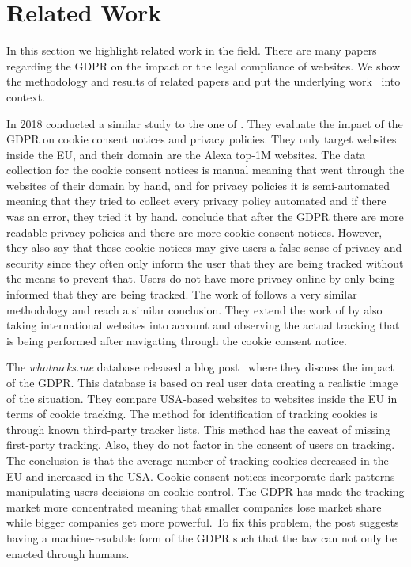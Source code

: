 \section{Related Work}
\label{sec:related}

In this section we highlight related work in the field. There are many papers regarding the GDPR on the impact or
the legal compliance of websites. We show the methodology and results of related papers and put the underlying
work~\cite{sanchez2019can} into context.

In 2018  conducted a similar study to the one of . They evaluate the impact of the
GDPR on cookie consent notices and privacy policies. They only target websites inside the EU, and their domain are the
Alexa top-1M websites. The data collection for the cookie consent notices is manual meaning that
\citeauthor{degeling2018we} went through the websites of their domain by hand, and for privacy policies it is
semi-automated meaning that they tried to collect every privacy policy automated and if there was an error, they tried
it by hand. \citeauthor{degeling2018we} conclude that after the GDPR there are more readable privacy policies
and there are more cookie consent notices. However, they also say that these cookie notices may give users a false sense
of privacy and security since they often only inform the user that they are being tracked without the means to prevent
that. Users do not have more privacy online by only being informed that they are being tracked. The work of
 follows a very similar methodology and reach a similar conclusion. They extend the work of
 by also taking international websites into account and observing the actual tracking that is being
performed after navigating through the cookie consent notice.

The \emph{whotracks.me} database released a blog post~\cite{whathappened} where they discuss the impact of the GDPR.
This database is based on real user data creating a realistic image of the situation. They compare USA-based websites to
websites inside the EU in terms of cookie tracking. The method for identification of tracking cookies is through known third-party
tracker lists. This method has the caveat of missing first-party tracking. Also, they do not factor in the consent of
users on tracking. The conclusion is that the average number of tracking cookies decreased in the EU and increased in
the USA. Cookie consent notices incorporate dark patterns manipulating users decisions on cookie control. The GDPR has
made the tracking market more concentrated meaning that smaller companies lose market share while bigger companies get
more powerful. To fix this problem, the post suggests having a machine-readable form of the GDPR such that the law can
not only be enacted through humans.

